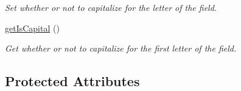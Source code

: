 \begin{DoxyCompactItemize}
\begin{DoxyCompactList}\small\item\em Set whether or not to capitalize for the letter of the field. \end{DoxyCompactList}\item 
\hypertarget{class_fields_ac52f815397270d01eeef3a2d33ce05cf}{\hyperlink{class_fields_ac52f815397270d01eeef3a2d33ce05cf}{get\-Is\-Capital} ()}\label{class_fields_ac52f815397270d01eeef3a2d33ce05cf}

\begin{DoxyCompactList}\small\item\em Get whether or not to capitalize for the first letter of the field. \end{DoxyCompactList}\end{DoxyCompactItemize}
\subsection*{Protected Attributes}
